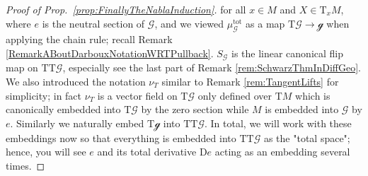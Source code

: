 \documentclass[a4paper,oneside,11pt,bibliography=totoc]{scrartcl}
\theoremstyle{plain}
\theoremstyle{remark}
\theoremstyle{definition}
\begin{document}
\begin{proof}[Proof of Prop.\ \ref{prop:FinallyTheNablaInduction}]
for all $x \in M$ and $X \in \mathrm{T}_xM$, where $e$ is the neutral section of $\mathcal{G}$, and we viewed $\mu_{\mathcal{G}}^{\mathrm{tot}}$ as a map $\mathrm{T}\mathcal{G} \to \mathcal{g}$ when applying the chain rule; recall Remark \ref{RemarkABoutDarbouxNotationWRTPullback}. $S_{\mathcal{G}}$ is the linear canonical flip map on $\mathrm{TT}\mathcal{G}$, especially see the last part of Remark \ref{rem:SchwarzThmInDiffGeo}. We also introduced the notation $\nu_T$ similar to Remark \ref{rem:TangentLifts} for simplicity; in fact $\nu_T$ is a vector field on $\mathrm{T}\mathcal{G}$ only defined over $\mathrm{T}M$ which is canonically embedded into $\mathrm{T}\mathcal{G}$ by the zero section while $M$ is embedded into $\mathcal{G}$ by $e$. Similarly we naturally embed $\mathrm{T}\mathcal{g}$ into $\mathrm{TT}\mathcal{G}$. In total, we will work with these embeddings now so that everything is embedded into $\mathrm{TT}\mathcal{G}$ as the "total space"; hence, you will see $e$ and its total derivative $\mathrm{D}e$ acting as an embedding several times.


\end{proof}
\end{document}
